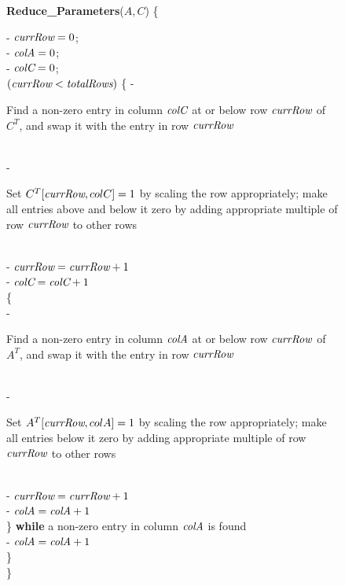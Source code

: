 \begin{figure}[t]
\hspace{-0.05in}\parbox{3.2in}{
{\bf Reduce\_Parameters}(\mbox{$A, C$}) \{
\begin{algorithmic}
\STATE - $\mbox{\it currRow} = 0$; \\ \vspace{6pt}
\STATE - $\mbox{\it colA} = 0$; \\ \vspace{6pt}
\STATE - $\mbox{\it colC} = 0$; \\ \vspace{6pt}
 $(\mbox{\it currRow} < \mbox{\it totalRows})$ \{
\IND
\STATE - \parbox[t]{2.85in}{Find a non-zero entry in column $\mbox{\it colC}$ at or below row $\mbox{\it currRow}$ of $C^T$, and swap it with the entry in row $\mbox{\it currRow}$} \\ \vspace{6pt}
\STATE - \parbox[t]{2.85in}{Set $C^T[\mbox{\it currRow}, colC] = 1$ by scaling the row appropriately; make all entries above and below it zero by adding appropriate multiple of row $\mbox{\it currRow}$ to other rows} \\ \vspace{6pt}
\STATE - $\mbox{\it currRow} = \mbox{\it currRow} + 1$ \\ \vspace{6pt}
\STATE - $\mbox{\it colC} = \mbox{\it colC} + 1$ \\ \vspace{6pt}
 \{  \\ \vspace{6pt}
\IND
\STATE - \parbox[t]{2.75in}{Find a non-zero entry in column $\mbox{\it colA}$ at or below row $\mbox{\it currRow}$ of $A^T$, and swap it with the entry in row $\mbox{\it currRow}$} \\ \vspace{6pt}
\STATE - \parbox[t]{2.75in}{Set $A^T[\mbox{\it currRow}, colA] = 1$ by scaling the row appropriately; make all entries below it zero by adding appropriate multiple of row $\mbox{\it currRow}$ to other rows} \\ \vspace{6pt}
\STATE - $\mbox{\it currRow} = \mbox{\it currRow} + 1$ \\ \vspace{6pt}
\STATE - $\mbox{\it colA} = \mbox{\it colA} + 1$ \\ \vspace{6pt}
\UND
\STATE \} {\bf while} a non-zero entry in column $\mbox{\it colA}$ is found \\ \vspace{6pt}
\STATE - $\mbox{\it colA} = \mbox{\it colA}+1$ \\ \vspace{6pt}
\STATE \} \\ \vspace{6pt}
\UND 
\STATE \} \\ \vspace{6pt}
\end{algorithmic}
} %


\end{figure}
